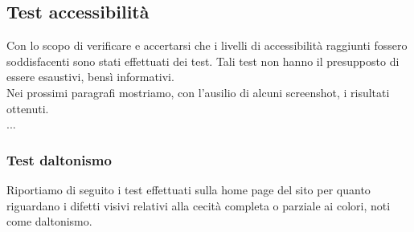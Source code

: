 \subsection{Test accessibilità}
Con lo scopo di verificare e accertarsi che i livelli di accessibilità raggiunti fossero soddisfacenti sono stati effettuati dei test. Tali test non hanno il presupposto di essere esaustivi, bensì informativi.\\
Nei prossimi paragrafi mostriamo, con l'ausilio di alcuni screenshot, i risultati ottenuti.\\
...
\subsubsection{Test daltonismo}
Riportiamo di seguito i test effettuati sulla home page del sito per quanto riguardano i difetti visivi relativi alla cecità completa o parziale ai colori, noti come daltonismo.
